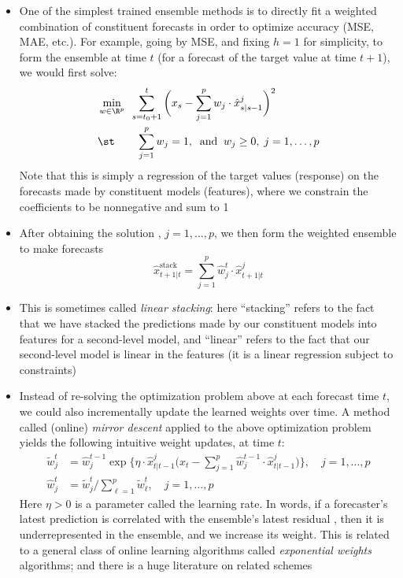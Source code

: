 \documentclass{article}
\begin{document}
\begin{itemize}
\item One of the simplest trained ensemble methods is to directly fit a weighted 
  combination of constituent forecasts in order to optimize accuracy (MSE, MAE,
  etc.). For example, going by MSE, and fixing $h=1$ for simplicity, to form the
  ensemble at time $t$ (for a forecast of the target value at time $t+1$), we
  would first solve:
  \begin{alignat*}{2}
  &\min_{w \in \R^p} && \hspace{-6pt} \sum_{s=t_0+1}^t \bigg( x_s - \sum_{j=1}^p
  w_j \cdot \hat{x}^j_{s|s-1} \bigg)^2 \\   
  &\st \quad && \sum_{j=1}^p w_j = 1, \;\;\text{and} \;\; w_j \geq 0, \;
  j=1,\dots,p   
  \end{alignat*}
  Note that this is simply a regression of the target values (response) on the
  forecasts made by constituent models (features), where we constrain the
  coefficients to be nonnegative and sum to 1

\item After obtaining the solution , $j = 1,\dots,p$, we
  then form the weighted ensemble to make forecasts 
  \[
  \hat{x}^{\text{stack}}_{t+1|t} = \sum_{j=1}^p \hat{w}^t_j \cdot
  \hat{x}^j_{t+1|t} 
  \]

\item This is sometimes called \emph{linear stacking}: here ``stacking'' refers
  to the fact that we have stacked the predictions made by our constituent
  models into features for a second-level model, and ``linear'' refers to the
  fact that our second-level model is linear in the features (it is a linear
  regression subject to constraints)  

\item Instead of re-solving the optimization problem above at each forecast time
  $t$, we could also incrementally update the learned weights over time. A
  method called (online) \emph{mirror descent} applied to the above optimization
  problem yields the following intuitive weight updates, at time $t$:    
  \begin{align*}
  \tilde{w}^t_j &= \hat{w}^{t-1}_j \exp\bigg\{ \eta \cdot \hat{x}^j_{t|t-1}
    \bigg( x_t -  \sum_{j=1}^p \hat{w}^{t-1}_j \cdot \hat{x}^j_{t|t-1} \bigg)
    \bigg\}, \quad j = 1,\dots,p \\
  \hat{w}^t_j &= \tilde{w}^t_j \bigg/ \sum_{\ell=1}^p \tilde{w}^t_\ell, \quad j =
    1,\dots,p 
  \end{align*}
  Here $\eta > 0$ is a parameter called the learning rate. In words, if a
  forecaster's latest prediction  is correlated with
  the ensemble's latest residual , then it is underrepresented in the ensemble, and
  we increase its weight. This is related to a general class of online learning 
  algorithms called \emph{exponential weights} algorithms; and there is a 
  huge literature on related schemes


\end{itemize}
\end{document}
